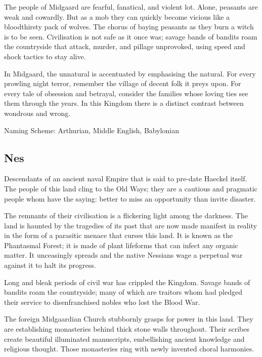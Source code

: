 \begin{multicols}{2}
The people of Midgaard are fearful, fanatical, and violent lot. Alone, peasants are weak and cowardly. But as a mob they can quickly become vicious like a bloodthirsty pack of wolves. The chorus of baying peasants as they burn a witch is to be seen. Civilisation is not safe as it once was; savage bands of bandits roam the countryside that attack, murder, and pillage unprovoked, using speed and shock tactics to stay alive.

In Midgaard, the unnatural is accentuated by emphasising the natural. For every prowling night terror, remember the village of decent folk it preys upon. For every tale of obsession and betrayal, consider the families whose loving ties see them through the years. In this Kingdom there is a distinct contrast between wondrous and wrong.

Naming Scheme: Arthurian, Middle English, Babylonian


\subsection{Nes} 

Descendants of an ancient naval Empire that is said to pre-date Haeckel itself. The people of this land cling to the Old Ways; they are a cautious and pragmatic people whom have the saying: better to miss an opportunity than invite disaster. 

The remnants of their civilisation is a flickering light among the darkness. The land is haunted by the tragedies of its past that are now made manifest in reality in the form of a parasitic menace that curses this land. It is known as the Phantasmal Forest; it is made of plant lifeforms that can infect any organic matter. It unceasingly spreads and the native Nessians wage a perpetual war against it to halt its progress. 

Long and bleak periods of civil war has crippled the Kingdom. Savage bands of bandits roam the countryside; many of which are traitors whom had pledged their service to disenfranchised nobles who lost the Blood War. 

The foreign Midgaardian Church stubbornly grasps for power in this land. They are establishing monasteries behind thick stone walls throughout. Their scribes create beautiful illuminated manuscripts, embellishing ancient knowledge and religious thought. Those monasteries ring with newly invented choral harmonies.


\end{multicols}
